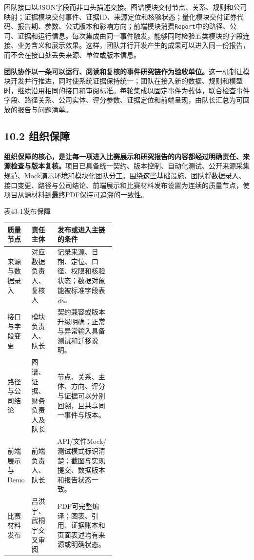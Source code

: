 团队接口以JSON字段而非口头描述交接。图谱模块交付节点、关系、规则和公司映射；证据模块交付事件、证据ID、来源定位和核验状态；量化模块交付证券代码、报告期、参数、公式版本和影响方向；前端模块消费\texttt{Report}中的路径、公司、证据和运行信息。每次集成由同一事件触发，能够同时检验五类模块的字段连接、业务含义和展示效果。这样，团队并行开发产生的成果可以进入同一份报告，而不会在接口处丢失来源、单位或版本信息。

\noindent\textbf{团队协作以一条可以运行、阅读和复核的事件研究链作为验收单位。}这一机制让模块开发并行推进，同时使系统证据保持统一；团队在接入新的数据、规则和模型时，继续沿用相同的接口和审阅标准。每轮集成以固定事件为载体，联合检查事件字段、路径关系、公司实体、评分参数、证据定位和前端呈现，由队长汇总为可回放的报告与问题清单。


\subsection*{10.2 组织保障}\label{page:43}
\noindent\textbf{组织保障的核心，是让每一项进入比赛展示和研究报告的内容都经过明确责任、来源检查与版本复核。}项目已具备统一契约、版本控制、自动化测试、公开来源采集规范、Mock演示环境和模块化团队分工。围绕这些基础设施，团队将数据录入、接口变更、路径与公司结论、前端展示和比赛材料发布设置为连续的质量节点，使项目从源材料到最终PDF保持可追溯的一致性\cite{lhy-data-standard,lhy-team}。

\begin{center}\small 表43-1\quad 发布保障\par\vspace{1mm}
\begin{tabularx}{\linewidth}{p{0.20\linewidth}p{0.24\linewidth}X}
\toprule
质量节点 & 责任主体 & 发布或进入主链的条件\\
\midrule
来源与数据录入 & 对应数据负责人、复核人 & 记录来源、日期、定位、口径、权限和核验状态；数据对象能被标准字段表示。\\
接口与字段变更 & 模块负责人、队长 & 契约兼容或版本升级明确；正常与异常输入具备测试和迁移说明。\\
路径与公司结论 & 图谱、证据、财务负责人及队长 & 节点、关系、主体、方向、评分与证据可以分别回溯，且共享同一事件与版本。\\
前端展示与Demo & 前端负责人、队长 & API/文件Mock/测试模式标识清楚；截图与实现提交、数据版本和报告状态一致。\\
比赛材料发布 & 吕洪宇、武桐宇交叉审阅 & PDF可完整编译；图表、引用、证据账本和页面表述均有来源或明确状态。\\
\bottomrule
\end{tabularx}\end{center}

